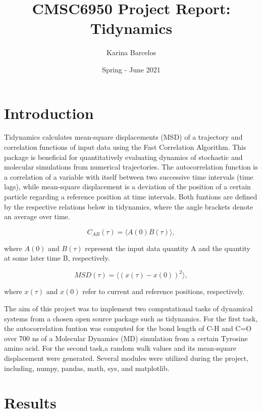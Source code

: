 \documentclass{article}
\title{CMSC6950 Project Report: Tidynamics}
\author{Karina Barcelos}
\date{Spring - June 2021}
\begin{document}
\maketitle

\section{Introduction}

Tidynamics \cite{Buyl2018} calculates mean-square displacements (MSD) of a trajectory and correlation functions of input data using the Fast Correlation Algorithm. \cite{kneller1995nmoldyn} This package is beneficial for quantitatively evaluating dynamics of stochastic and molecular simulations from numerical trajectories. The autocorrelation function is a correlation of a variable with itself between two successive time intervals (time lags), while mean-square displacement is a deviation of the position of a certain particle regarding a reference position at time intervals. Both funtions are defined by the respective relations below in tidynamics, where the angle brackets denote an average over time. \cite{kneller1995nmoldyn}

\begin{equation}
C_{AB}(\tau) = \langle A(0) B(\tau) \rangle,
\label{correlation}
\end{equation}

where  $A(0)$ and $B(\tau)$ represent the input data quantity A and the quantity at some later time B, respectively.

\begin{equation}
MSD(\tau) = \langle (x(\tau) - x(0) )^2 \rangle,
\label{msd}
\end{equation}

where $x(\tau)$ and $x(0)$ refer to current and reference positions, respectively.\hfill \break

The aim of this project was to implement two computational tasks of dynamical systems from a chosen open source package such as tidynamics\cite{Buyl2018}. For the first task, the autocorrelation funtion was computed for the bond length of C-H and C=O over 700 ns of a Molecular Dynamics (MD) simulation from a certain Tyrosine amino acid. For the second task,a random walk values and its mean-square displacement were generated. Several modules were utilized during the project, including, numpy, pandas, math, sys, and matplotlib. 

\section{Results}
\end{document}
